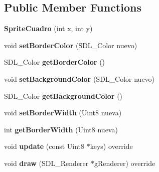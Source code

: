 \subsection*{Public Member Functions}
\begin{DoxyCompactItemize}
\item 
{\bfseries Sprite\+Cuadro} (int x, int y)\hypertarget{class_sprite_cuadro_ae73f507057ee2239b54c264f1fdcaa89}{}\label{class_sprite_cuadro_ae73f507057ee2239b54c264f1fdcaa89}

\item 
void {\bfseries set\+Border\+Color} (S\+D\+L\+\_\+\+Color nuevo)\hypertarget{class_sprite_cuadro_ae1f11275da1e71a46a8e61e83570ba5c}{}\label{class_sprite_cuadro_ae1f11275da1e71a46a8e61e83570ba5c}

\item 
S\+D\+L\+\_\+\+Color {\bfseries get\+Border\+Color} ()\hypertarget{class_sprite_cuadro_a4222db119566ba85d610796d42b3f9fc}{}\label{class_sprite_cuadro_a4222db119566ba85d610796d42b3f9fc}

\item 
void {\bfseries set\+Background\+Color} (S\+D\+L\+\_\+\+Color nuevo)\hypertarget{class_sprite_cuadro_ada08809c7f150b2dc08fad7924b11b64}{}\label{class_sprite_cuadro_ada08809c7f150b2dc08fad7924b11b64}

\item 
S\+D\+L\+\_\+\+Color {\bfseries get\+Background\+Color} ()\hypertarget{class_sprite_cuadro_a1fd410af303824bde1c5ec323f5b2c25}{}\label{class_sprite_cuadro_a1fd410af303824bde1c5ec323f5b2c25}

\item 
void {\bfseries set\+Border\+Width} (Uint8 nueva)\hypertarget{class_sprite_cuadro_a4926880774b0995c75daf04aeb1c1282}{}\label{class_sprite_cuadro_a4926880774b0995c75daf04aeb1c1282}

\item 
int {\bfseries get\+Border\+Width} (Uint8 nueva)\hypertarget{class_sprite_cuadro_aaaec113136b5a06587822962e38d2309}{}\label{class_sprite_cuadro_aaaec113136b5a06587822962e38d2309}

\item 
void {\bfseries update} (const Uint8 $\ast$keys) override\hypertarget{class_sprite_cuadro_a63ec9ade94b9bc01474d7971b2f4e7aa}{}\label{class_sprite_cuadro_a63ec9ade94b9bc01474d7971b2f4e7aa}

\item 
void {\bfseries draw} (S\+D\+L\+\_\+\+Renderer $\ast$g\+Renderer) override\hypertarget{class_sprite_cuadro_a663223bb8e13657f3a0c968d8e1e79bf}{}\label{class_sprite_cuadro_a663223bb8e13657f3a0c968d8e1e79bf}

\end{DoxyCompactItemize}

